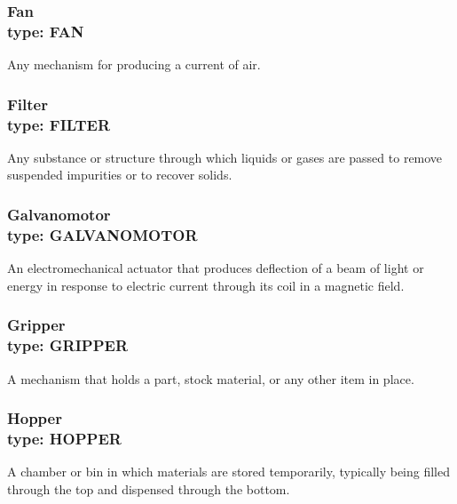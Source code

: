 \subsubsection[Fan]{Fan \\ {\small type: FAN}}
\label{sec:Fan}



Any mechanism for producing a current of air.



\subsubsection[Filter]{Filter \\ {\small type: FILTER}}
\label{sec:Filter}



Any substance or structure through which liquids or gases are passed to remove suspended impurities or to recover solids.



\subsubsection[Galvanomotor]{Galvanomotor \\ {\small type: GALVANOMOTOR}}
\label{sec:Galvanomotor}



An electromechanical actuator that produces deflection of a beam of light or energy in response to electric current through its coil in a magnetic field.



\subsubsection[Gripper]{Gripper \\ {\small type: GRIPPER}}
\label{sec:Gripper}



A mechanism that holds a part, stock material, or any other item in place.



\subsubsection[Hopper]{Hopper \\ {\small type: HOPPER}}
\label{sec:Hopper}



A chamber or bin in which materials are stored temporarily, typically being filled through the top and dispensed through the bottom.



